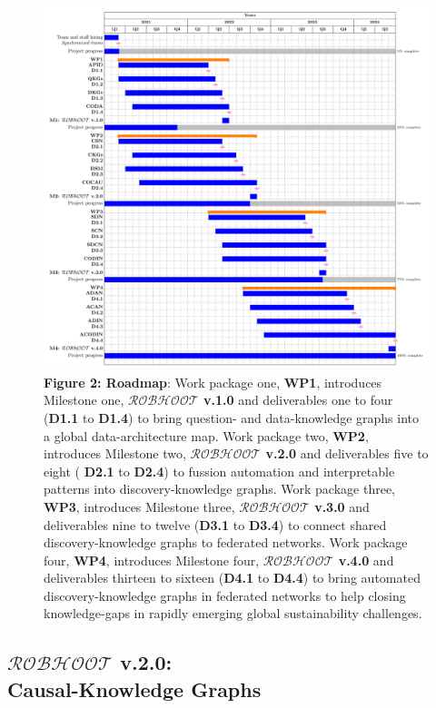\documentclass[11pt, a4paper]{article} %
\begin{document}
 \begin{figure}[h!]
   \includegraphics[width=1\textwidth]{Figures/GanttChart.pdf} {\small
     {\bf Figure 2: Roadmap}: Work package one, {\bf WP1}, introduces
     Milestone one, {\bf $\mathcal{ROBHOOT}$ v.1.0} and deliverables
     one to four ({\bf D1.1} to {\bf D1.4}) to bring question- and
     data-knowledge graphs into a global data-architecture map. Work
     package two, {\bf WP2}, introduces Milestone two, {\bf
       $\mathcal{ROBHOOT}$ v.2.0} and deliverables five to eight ({\bf
       D2.1} to {\bf D2.4}) to fussion automation and interpretable
     patterns into discovery-knowledge graphs. Work package three,
     {\bf WP3}, introduces Milestone three, {\bf $\mathcal{ROBHOOT}$
       v.3.0} and deliverables nine to twelve ({\bf D3.1} to {\bf
       D3.4}) to connect shared discovery-knowledge graphs to
     federated networks. Work package four, {\bf WP4}, introduces
     Milestone four, {\bf $\mathcal{ROBHOOT}$ v.4.0} and deliverables
     thirteen to sixteen ({\bf D4.1} to {\bf D4.4}) to bring automated
     discovery-knowledge graphs in federated networks to help closing
     knowledge-gaps in rapidly emerging global sustainability
     challenges.}
\end{figure}


\subsection{{\bf $\mathcal{ROBHOOT}$ v.2.0}: \\ Causal-Knowledge Graphs}
\end{document}
